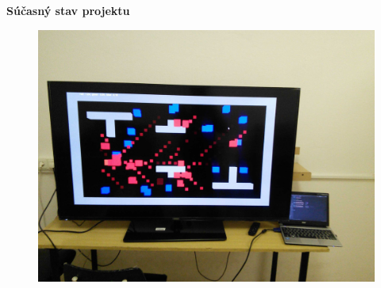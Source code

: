 \documentclass[xcolor=dvipsnames]{beamer}
\begin{document}
\begin{frame}{\bf Súčasný stav projektu}

\begin{figure}[ht]
\begin{center}
\begin{minipage}{0.8\linewidth}
\begin{center}
\includegraphics[width=1.0\textwidth]{images/aeris_01.jpg}
\end{center}
\end{minipage}
\end{center}
\end{figure}

\end{frame}
\end{document}
